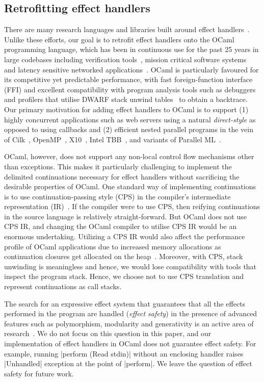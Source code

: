 \documentclass[sigplan,10pt,review,anonymous]{acmart}\settopmatter{printfolios=true,printccs=false,printacmref=false}
\begin{document}
\subsection{Retrofitting effect handlers}

There are many research languages and libraries built around effect
handlers~\cite{Leijen14,Hillerstrom20,Pyro,Frank,Eff}. Unlike these efforts, our
goal is to retrofit effect handlers onto the OCaml programming language, which
has been in continuous use for the past 25 years in large codebases including
verification tools~\cite{everest,Coq}, mission critical software
systems~\cite{astree} and latency sensitive networked
applications~\cite{Madhavapeddy13}. OCaml is particularly favoured for its
competitive yet predictable performance, with fast foreign-function interface
(FFI) and excellent compatibility with program analysis tools such as debuggers
and profilers that utilise DWARF stack unwind tables~\cite{DWARF} to obtain a
backtrace. Our primary motivation for adding effect handlers to OCaml is to
support (1) highly concurrent applications such as web servers using a
natural \emph{direct-style} as opposed to using callbacks and (2) efficient
nested parallel programs in the vein of Cilk~\cite{Cilk}, OpenMP~\cite{OpenMP},
X10~\cite{Charles05}, Intel TBB~\cite{IntelTBB}, and variants of Parallel
ML~\cite{MaPLe, Fluet10, Sivaramakrishnan14}.

OCaml, however, does not support any non-local control flow mechanisms other
than exceptions. This makes it particularly challenging to implement the
delimited continuations necessary for effect handlers without sacrificing the
desirable properties of OCaml. One standard way of implementing continuations is
to use continuation-passing style (CPS) in the compiler's intermediate
representation (IR)~\cite{Leijen14}. If the compiler were to use CPS, then
reifying continuations in the source language is relatively straight-forward.
But OCaml does not use CPS IR, and changing the OCaml compiler to utilise CPS IR
would be an enormous undertaking. Utilizing a CPS IR would also affect the
performance profile of OCaml applications due to increased memory allocations as
continuation closures get allocated on the heap~\cite{Farvardin20}. Moreover,
with CPS, stack unwinding is meaningless and hence, we would lose compatibility
with tools that inspect the program stack. Hence, we choose not to use CPS
translation and represent continuations as call stacks.

The search for an expressive effect system that guarantees that all the effects
performed in the program are handled (\emph{effect safety}) in the presence of
advanced features such as polymorphism, modularity and generativity is an
active area of research~\cite{Leijen14, Biernacki19, Biernacki20,
Hillerstrom20}. We do not focus on this question in this paper, and our
implementation of effect handlers in OCaml does not guarantee effect safety.
For example, running |perform (Read stdin)| without an enclosing handler raises
|Unhandled| exception at the point of |perform|. We leave the question of
effect safety for future work.
\end{document}
